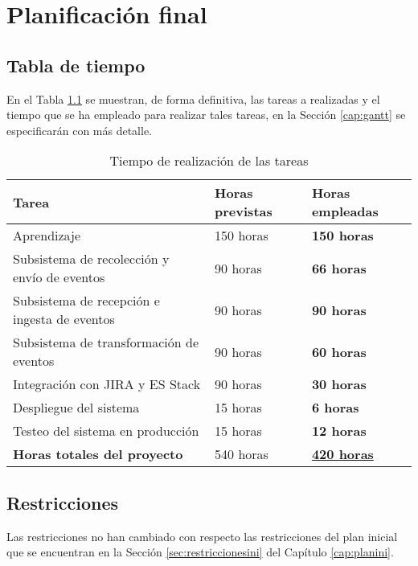 \chapter{Planificación final}\label{cap:planificacion}


\section{Tabla de tiempo}
En el Tabla \ref{tabla:tiempotareas} se muestran, de forma definitiva, las tareas a realizadas y el tiempo que se ha empleado para realizar tales tareas, en la Sección \ref{cap:gantt} se especificarán con más detalle.

\begin{table}[H]\label{tabla:tiempotareas}
	\centering
	\begin{tabular}{|l|l|l|}
		\hline
		\textbf{Tarea}                               & \textbf{Horas previstas} & \textbf{Horas empleadas}       \\ \hline
		Aprendizaje                                  & 150 horas                & \textbf{150 horas}             \\ \hline
		Subsistema de recolección y envío de eventos & 90 horas                 & \textbf{66 horas}              \\ \hline
		Subsistema de recepción e ingesta de eventos & 90 horas                 & \textbf{90 horas}              \\ \hline
		Subsistema de transformación de eventos      & 90 horas                 & \textbf{60 horas}              \\ \hline
		Integración con JIRA y ES Stack              & 90 horas                 & \textbf{30 horas}              \\ \hline
		Despliegue del sistema                       & 15 horas                 & \textbf{6 horas}               \\ \hline
		Testeo del sistema en producción             & 15 horas                 & \textbf{12 horas}              \\ \hline
		\textbf{Horas totales del proyecto}          & 540 horas                & \underline{\textbf{420 horas}} \\ \hline
	\end{tabular}
	\caption{Tiempo de realización de las tareas}
\end{table}

\section{Restricciones}
Las restricciones no han cambiado con respecto las restricciones del plan inicial que se encuentran en la Sección \ref{sec:restriccionesini} del Capítulo \ref{cap:planini}.

